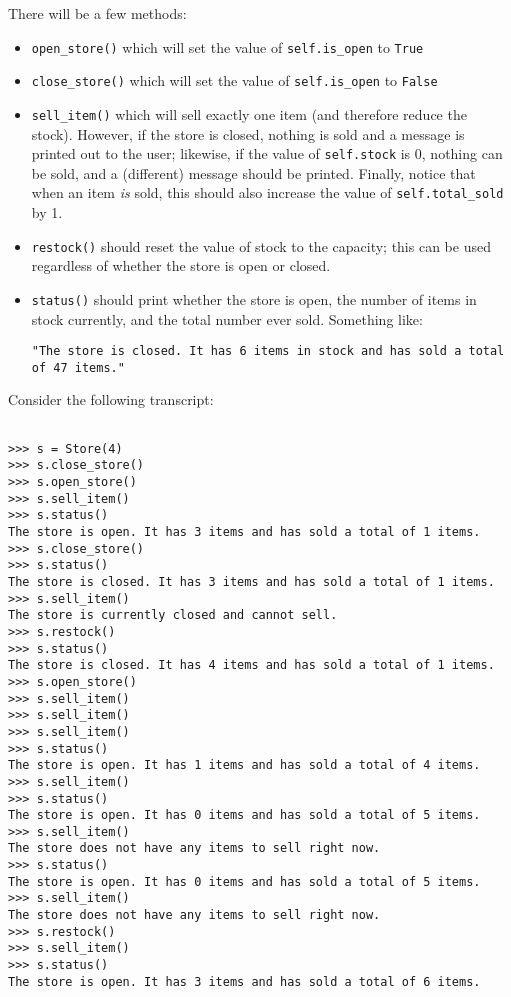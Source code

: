 \documentclass{article}
\begin{document}
\begin{enumerate}
There will be a few methods:

\begin{itemize}
  \item \verb|open_store()| which will set the value of \verb|self.is_open| to \verb|True|
  \item \verb|close_store()| which will set the value of \verb|self.is_open| to \verb|False|
  \item \verb|sell_item()| which will sell exactly one item (and therefore reduce the stock). However, if the store is closed, nothing is sold and a message is printed out to the user; likewise, if the value of \verb|self.stock| is 0, nothing can be sold, and a (different) message should be printed.  Finally, notice that when an item \emph{is} sold, this should also increase the value of \verb|self.total_sold| by 1.
  \item \verb|restock()| should reset the value of stock to the capacity; this can be used regardless of whether the store is open or closed.
  \item \verb|status()| should print whether the store is open, the number of items in stock currently, and the total number ever sold.  Something like:

   \verb|"The store is closed. It has 6 items in stock and has sold a total of 47 items."|

\end{itemize}

Consider the following transcript:

\begin{verbatim}

>>> s = Store(4)
>>> s.close_store()
>>> s.open_store()
>>> s.sell_item()
>>> s.status()
The store is open. It has 3 items and has sold a total of 1 items.
>>> s.close_store()
>>> s.status()
The store is closed. It has 3 items and has sold a total of 1 items.
>>> s.sell_item()
The store is currently closed and cannot sell.
>>> s.restock()
>>> s.status()
The store is closed. It has 4 items and has sold a total of 1 items.
>>> s.open_store()
>>> s.sell_item()
>>> s.sell_item()
>>> s.sell_item()
>>> s.status()
The store is open. It has 1 items and has sold a total of 4 items.
>>> s.sell_item()
>>> s.status()
The store is open. It has 0 items and has sold a total of 5 items.
>>> s.sell_item()
The store does not have any items to sell right now.
>>> s.status()
The store is open. It has 0 items and has sold a total of 5 items.
>>> s.sell_item()
The store does not have any items to sell right now.
>>> s.restock()
>>> s.sell_item()
>>> s.status()
The store is open. It has 3 items and has sold a total of 6 items.


\end{verbatim}
\end{enumerate}
\end{document}
